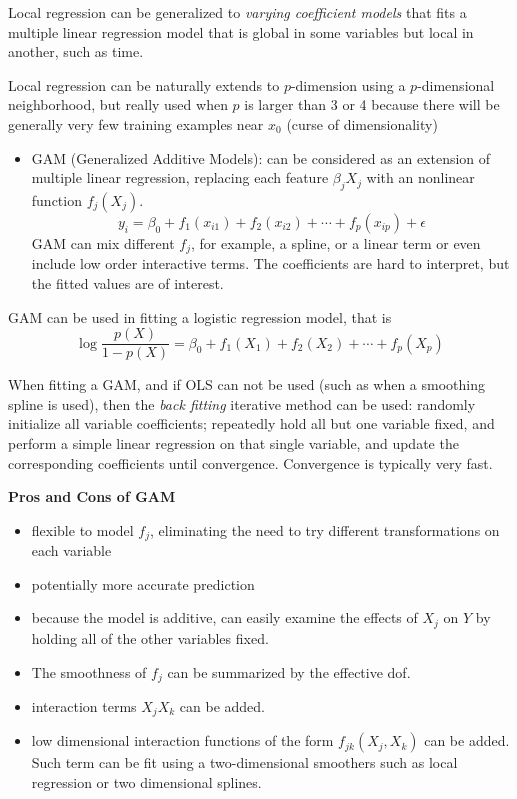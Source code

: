 \documentclass[
  letterpaper,
  DIV=11,
  numbers=noendperiod]{scrreprt}
\providecommand{\tightlist}{%
  \setlength{\itemsep}{0pt}\setlength{\parskip}{0pt}}\usepackage{longtable,booktabs,array}
\begin{document}
Local regression can be generalized to \emph{varying coefficient models}
that fits a multiple linear regression model that is global in some
variables but local in another, such as time.

Local regression can be naturally extends to \(p\)-dimension using a
\(p\)-dimensional neighborhood, but really used when \(p\) is larger
than 3 or 4 because there will be generally very few training examples
near \(x_0\) (curse of dimensionality)

\begin{itemize}
\tightlist
\item
  GAM (Generalized Additive Models): can be considered as an extension
  of multiple linear regression, replacing each feature \(\beta_jX_j\)
  with an nonlinear function \(f_j(X_j)\). \[
  y_i = \beta_0 + f_1(x_{i1}) + f_2(x_{i2}) +\cdots + f_p(x_{ip})  + \epsilon
  \] GAM can mix different \(f_j\), for example, a spline, or a linear
  term or even include low order interactive terms. The coefficients are
  hard to interpret, but the fitted values are of interest.
\end{itemize}

GAM can be used in fitting a logistic regression model, that is \[
\log \frac{p(X)}{1-p(X)} =\beta_0+f_1(X_1)+f_2(X_2)+\cdots +f_p(X_p)
\]

When fitting a GAM, and if OLS can not be used (such as when a smoothing
spline is used), then the \emph{back fitting} iterative method can be
used: randomly initialize all variable coefficients; repeatedly hold all
but one variable fixed, and perform a simple linear regression on that
single variable, and update the corresponding coefficients until
convergence. Convergence is typically very fast.

\textbf{Pros and Cons of GAM}

\begin{itemize}
\tightlist
\item
  flexible to model \(f_j\), eliminating the need to try different
  transformations on each variable
\item
  potentially more accurate prediction
\item
  because the model is additive, can easily examine the effects of
  \(X_j\) on \(Y\) by holding all of the other variables fixed.
\item
  The smoothness of \(f_j\) can be summarized by the effective dof.
\item
  interaction terms \(X_jX_k\) can be added.
\item
  low dimensional interaction functions of the form \(f_{jk}(X_j, X_k)\)
  can be added. Such term can be fit using a two-dimensional smoothers
  such as local regression or two dimensional splines.
\end{itemize}
\end{document}
